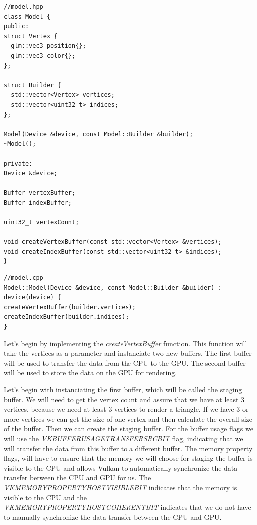 \documentclass[12pt]{report} \usepackage{preamble}
\begin{document}
\begin{lstlisting}[Language=C++]
//model.hpp
class Model {
public:
struct Vertex {
  glm::vec3 position{};
  glm::vec3 color{};
};

struct Builder {
  std::vector<Vertex> vertices;
  std::vector<uint32_t> indices;
};

Model(Device &device, const Model::Builder &builder);
~Model();

private:
Device &device;

Buffer vertexBuffer;
Buffer indexBuffer;

uint32_t vertexCount;

void createVertexBuffer(const std::vector<Vertex> &vertices);
void createIndexBuffer(const std::vector<uint32_t> &indices);
}
\end{lstlisting}

\begin{lstlisting}[Language=C++]
//model.cpp
Model::Model(Device &device, const Model::Builder &builder) : device{device} {
createVertexBuffer(builder.vertices);
createIndexBuffer(builder.indices);
}
\end{lstlisting}

Let's begin by implementing the \textit{createVertexBuffer} function. This function will take the vertices as a parameter and instanciate two new buffers.
The first buffer will be used to transfer the data from the CPU to the GPU. The second buffer will be used to store the data on the GPU for rendering.

Let's begin with instanciating the first buffer, which will be called the staging buffer.
We will need to get the vertex count and assure that we have at least 3 vertices, because we need at least 3 vertices to render a triangle.
If we have 3 or more vertices we can get the size of one vertex and then calculate the overall size of the buffer.
Then we can create the staging buffer.
For the buffer usage flags we will use the \textit{VK\textunderscore BUFFER\textunderscore USAGE\textunderscore TRANSFER\textunderscore SRC\textunderscore BIT}
flag, indicating that we will transfer the data from this buffer to a different buffer. The memory property flags, will have to ensure
that the memory we will choose for staging the buffer is visible to the CPU and allows Vulkan to automatically synchronize the data transfer between the CPU and GPU
for us. The \textit{VK\textunderscore MEMORY\textunderscore PROPERTY\textunderscore HOST\textunderscore VISIBLE\textunderscore BIT}
indicates that the memory is visible to the CPU and the \\
\textit{VK\textunderscore MEMORY\textunderscore PROPERTY\textunderscore HOST\textunderscore COHERENT\textunderscore BIT}
indicates that we do not have to manually synchronize the data transfer between the CPU and GPU.
\end{document}
